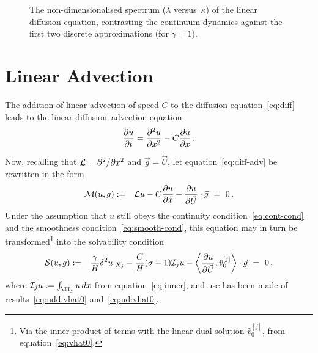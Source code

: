 \documentclass[12pt,a5paper]{article}
\begin{document}
\begin{figure}[hbt]
\centering
{}
\caption{The  non-dimensionalised spectrum ($\bar{\lambda}$ versus~$\kappa$) of the linear diffusion equation, contrasting the 
continuum dynamics against the first two discrete approximations (for $\gamma=1$).}
\label{fig:spec:2nd-order:nd}
\end{figure}

\section{Linear Advection}\label{sec:lin-adv}
The addition of linear advection of speed $C$ to the diffusion equation~\eqref{eq:diff} leads to the
linear diffusion--advection equation
\begin{eqnarray}
	\D tu = \DD xu - C\D xu\,.
	\label{eq:diff-adv}
\end{eqnarray}
Now, recalling that ${\cal L}=\DD{x}{}$ and $\vec{g}=\dot{\vec{U}}$, let equation~\eqref{eq:diff-adv} be rewritten in the form
\begin{eqnarray}
{\cal M}(u,g) & := & {\cal L}u-C\D xu-\D{\vec{U}}{u}\cdot\vec{g}~=~0\,.
\label{eq:Mug}
\end{eqnarray}
Under the assumption that $u$ still obeys the continuity condition~\eqref{eq:cont-cond} and the smoothness condition~\eqref{eq:smooth-cond}, this equation may in turn be transformed\footnote{Via the inner product of terms with the
linear dual solution $\hat{v}_0^{[j]}$, from equation~\eqref{eq:vhat0}.} into the solvability condition
\begin{eqnarray}
       {\cal S}(u,g) & := & 
          \frac{\gamma}{H}\delta^2u|_{X_j} - \frac{C}{H}(\sigma-1){\cal I}_j u
	-\left\langle\D {\vec U}u,\hat{v}_0^{[j]}\right\rangle\cdot\vec{g}~=~0 \,,
\label{eq:Sug}
\end{eqnarray}
where ${\cal I}_j u := \int_{\II_j}u\,dx$
from equation~\eqref{eq:inner}, and
use has been made of results~\eqref{eq:udd:vhat0} and~\eqref{eq:ud:vhat0}.
\end{document}
